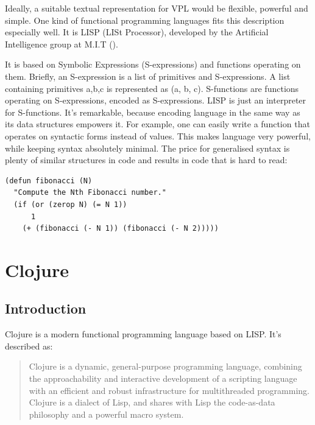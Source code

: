 \documentclass[11pt]{scrartcl}
\begin{document}
Ideally, a suitable textual representation for VPL would be flexible, powerful
and simple.
One kind of functional programming languages fits this description especially
well.
It is LISP (LISt Processor), developed by the Artificial Intelligence group at
M.I.T (\cite{recursive}).

It is based on Symbolic Expressions (S-expressions) and functions operating on
them.
Briefly, an S-expression is a list of primitives and S-expressions.
A list containing primitives a,b,c is represented as (a, b, c).
S-functions are functions operating on S-expressions, encoded as S-expressions.
LISP is just an interpreter for S-functions.
It’s remarkable, because encoding language in the same way as its data
structures empowers it.
For example, one can easily write a function that operates on syntactic forms
instead of values.
This makes language very powerful, while keeping syntax absolutely minimal.
The price for generalised syntax is plenty of similar structures in code and
results in code that is hard to read:

\begin{lstlisting}
(defun fibonacci (N)
  "Compute the Nth Fibonacci number."
  (if (or (zerop N) (= N 1))
      1
    (+ (fibonacci (- N 1)) (fibonacci (- N 2)))))
\end{lstlisting}

\section{Clojure}
\subsection{Introduction}
Clojure is a modern functional programming language based on LISP. It’s
described as:

\blockquote[{\cite{clojure_website}}]{Clojure is a dynamic, general-purpose
  programming language, combining the approachability and interactive
  development of a scripting language with an efficient and robust
  infrastructure for multithreaded programming. Clojure is a dialect of Lisp,
  and shares with Lisp the code-as-data philosophy and a powerful macro system.}
\end{document}
